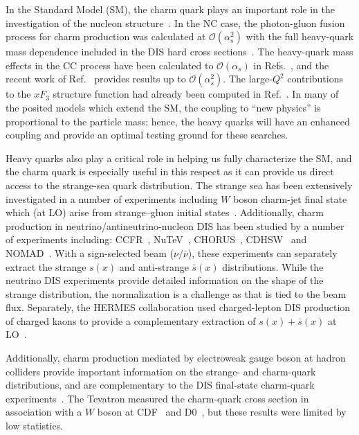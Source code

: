 \documentclass[pdftex,twocolumn,epjc3]{svjour3}          %
\begin{document}
In the Standard Model (SM), the charm quark plays an important role in
the investigation of the nucleon
structure~\cite{Behnke:2015qja,Zenaiev:2016kfl,Abdolmaleki:2017wlg}.
%
In the NC case, the photon-gluon fusion process for charm production
was calculated at ${\mathcal{O}}(\alpha_s^2)$ with the full
heavy-quark mass dependence included in the DIS hard cross
sections~\cite{Laenen:1992zk,Laenen:1992xs}.
%
The heavy-quark mass effects in the CC process have been calculated to
${\mathcal{O}}(\alpha_s)$ in
Refs.~\cite{Gottschalk:1980rv,Gluck:1997sj,Blumlein:2011zu,Buza:1997mg,Blumlein:2014fqa},
and the recent work of Ref.~\cite{Berger:2016inr} provides results up
to ${\mathcal{O}}(\alpha_s^2)$. The large-$Q^2$ contributions to the
$xF_3$ structure function had already been computed in
Ref.~\cite{Behring:2015roa}.
%
In many of the posited models which extend the SM, the coupling to
``new physics'' is proportional to the particle mass; hence, the heavy
quarks will have an enhanced coupling and provide an optimal testing
ground for these searches.

Heavy quarks also play a critical role in helping us fully
characterize the SM, and the charm quark is especially useful in this
respect as it can provide us direct access to the strange-sea quark
distribution.
%
The strange sea has been extensively investigated in a number of
experiments including $W$ boson charm-jet final state which (at LO)
arise from strange--gluon initial states~\cite{Aaltonen:2007dm,Abazov:2008qz,Abazov:2014fka,Chatrchyan:2013uja,Aad:2014xca,Sirunyan:2018hde}.
%
Additionally, charm production in neutrino/antineutrino-nucleon DIS
has been studied by a number of experiments including:
%
CCFR~\cite{Seligman:1997mc},
NuTeV~\cite{Tzanov:2005kr},
CHORUS~\cite{Onengut:2005kv},
CDHSW~\cite{Berge:1989hr}
and
NOMAD~\cite{Samoylov:2013xoa}.
%
With a sign-selected beam ($\nu/\bar{\nu}$), these experiments can
separately extract the strange $s(x)$ and anti-strange $\bar{s}(x)$
distributions. While the neutrino DIS experiments provide
detailed information on the shape of the strange distribution, the
normalization is a challenge as that is tied to the beam flux.
%
Separately, the HERMES collaboration used charged-lepton DIS
production of charged kaons to provide a complementary extraction of
$s(x)+ \bar{s}(x)$ at LO~\cite{Airapetian:2008qf}.

Additionally, charm production mediated by electroweak gauge boson at
hadron colliders provide important information on the strange- and
charm-quark distributions, and are complementary to the DIS final-state
charm-quark experiments~\cite{Lai:2007dq}.
%
The Tevatron measured the charm-quark cross section in association
with a $W$ boson at CDF~\cite{Aaltonen:2007dm} and
D0~\cite{Abazov:2008qz}, but these results were limited by low
statistics.
\end{document}
